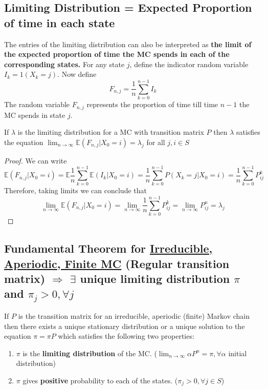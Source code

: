 \documentclass[11pt]{elegantbook}
\begin{document}
\subsection{Limiting Distribution = Expected Proportion of time in each state}
The entries of the limiting distribution can also be interpreted as \textbf{the limit of the expected proportion of time the MC spends in each of the corresponding states.} For any state $j$, define the indicator random variable $I_k=1(X_k=j)$. Now define $$F_{n,j}=\frac{1}{n}\sum_{k=0}^{n-1}I_k$$
The random variable $F_{n,j}$ represents the proportion of time till time $n-1$ the MC spends in state $j$.

\begin{lemma}
    If $\lambda$ is the limiting distribution for a MC with transition matrix $P$ then $\lambda$ satisfies the equation $\lim_{n \rightarrow \infty}\mathbb{E}(F_{n,j}|X_0=i)=\lambda_j$ for all $j,i\in S$
\end{lemma}
\begin{proof}
    We can write $$\mathbb{E}(F_{n,j}|X_0=i)=\mathbb{E}\frac{1}{n}\sum_{k=0}^{n-1}\mathbb{E}(I_k|X_0=i)=\frac{1}{n}\sum_{k=0}^{n-1}P(X_k=j|X_0=i)=\frac{1}{n}\sum_{k=0}^{n-1}P_{ij}^k$$
    Therefore, taking limits we can conclude that $$\lim_{n \rightarrow \infty}\mathbb{E}(F_{n,j}|X_0=i)=\lim_{n \rightarrow \infty}\frac{1}{n}\sum_{k=0}^{n-1}P_{ij}^k=\lim_{n \rightarrow \infty}P_{ij}^n=\lambda_j$$
\end{proof}

\subsection{Fundamental Theorem for \underline{Irreducible, Aperiodic, Finite MC} (Regular transition matrix) $\Rightarrow $ $\exists$ unique limiting distribution $\pi$ and $\pi_j>0,\forall j$}
\begin{theorem}
    If $P$ is the transition matrix for an irreducible, aperiodic (finite) Markov chain then there exists a unique stationary distribution or a unique solution to the equation $\pi=\pi P$ which satisfies the following two properties:
    \begin{enumerate}[(1)]
        \item $\pi$ is the \textbf{limiting distribution} of the MC. ($\lim_{n \rightarrow \infty}\alpha P^n=\pi,\forall \alpha$ initial distribution)
        \item $\pi$ gives \textbf{positive} probability to each of the states. ($\pi_j>0,\forall j\in S$)
    \end{enumerate}
\end{theorem}
\end{document}
